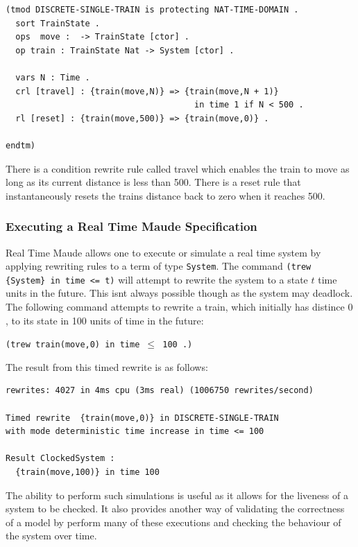 \begin{lstlisting}
(tmod DISCRETE-SINGLE-TRAIN is protecting NAT-TIME-DOMAIN .
  sort TrainState .
  ops  move :  -> TrainState [ctor] .
  op train : TrainState Nat -> System [ctor] .
 
  vars N : Time .
  crl [travel] : {train(move,N)} => {train(move,N + 1)} 
                                      in time 1 if N < 500 .
  rl [reset] : {train(move,500)} => {train(move,0)} . 
         
endtm)
\end{lstlisting}
There is a condition rewrite rule called travel which enables the train to move as long as its current distance is less than 500. There is a reset rule that instantaneously resets the trains distance back to zero when it reaches 500.


\subsubsection*{Executing a Real Time Maude Specification}
Real Time Maude allows one to execute or simulate a real time system by applying rewriting rules to a term of type \texttt{System}.
The command \texttt{(trew \{System\} in time <= t)} will attempt to rewrite the system to a state $t$ time units in the future. This isnt always possible though as the system may deadlock. The following command attempts to rewrite a train, which initially has distince $0$, to its state in 100 units of time in the future: 
\begin{center}
\texttt{(trew {train(move,0)} in time $\leq$ 100 .)}
\end{center}

The result from this timed rewrite is as follows:
\begin{lstlisting}
rewrites: 4027 in 4ms cpu (3ms real) (1006750 rewrites/second)

Timed rewrite  {train(move,0)} in DISCRETE-SINGLE-TRAIN 
with mode deterministic time increase in time <= 100

Result ClockedSystem :
  {train(move,100)} in time 100
\end{lstlisting}

The ability to perform such simulations is useful as it allows for the liveness of a system to be checked. It also provides another way of validating the correctness of a model by perform many of these executions and checking the behaviour of the system over time.

